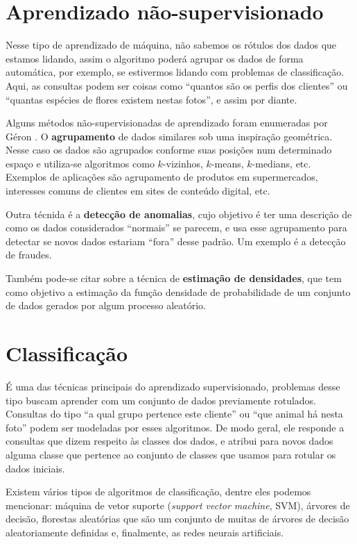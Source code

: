 \documentclass[12pt,brazil]{article}
\newcommand{\eng}[1]{\emph{#1}}
\begin{document}
\section*{Aprendizado não-supervisionado}

Nesse tipo de aprendizado de máquina, não sabemos os rótulos dos dados que estamos lidando, assim o algoritmo poderá agrupar os dados de forma automática, por exemplo, se estivermos lidando com problemas de classificação. Aqui, as consultas podem ser coisas como ``quantos são os perfis dos clientes'' ou ``quantas espécies de flores existem nestas fotos'', e assim por diante.

Alguns métodos não-supervisionadas de aprendizado foram enumeradas por Géron \citep{hands}. O \textbf{agrupamento} de dados similares sob uma inspiração geométrica. Nesse caso os dados são agrupados conforme suas posições num determinado espaço e utiliza-se algoritmos como $k$-vizinhos, $k$-means, $k$-medians, etc. Exemplos de aplicações são agrupamento de produtos em supermercados, interesses comuns de clientes em sites de conteúdo digital, etc.

Outra técnida é a \textbf{detecção de anomalias}, cujo objetivo é ter uma descrição de como os dados considerados ``normais'' se parecem, e usa esse agrupamento para detectar se novos dados estariam ``fora'' desse padrão. Um exemplo é a detecção de fraudes.

Também pode-se citar sobre a técnica de \textbf{estimação de densidades}, que tem como objetivo a estimação da função densidade de probabilidade de um conjunto de dados gerados por algum processo aleatório.

\section{Classificação}

É uma das técnicas principais do aprendizado supervisionado, problemas desse tipo buscam aprender com um conjunto de dados previamente rotulados. Consultas do tipo ``a qual grupo pertence este cliente'' ou ``que animal há nesta foto'' podem ser modeladas por esses algoritmos. De modo geral, ele responde a consultas que dizem respeito às classes dos dados, e atribui para novos dados alguma classe que pertence ao conjunto de classes que usamos para rotular os dados iniciais.

Existem vários tipos de algoritmos de classificação, dentre eles podemos mencionar: máquina de vetor suporte (\eng{support vector machine}, SVM), árvores de decisão, florestas aleatórias que são um conjunto de muitas de árvores de decisão aleatoriamente definidas e, finalmente, as redes neurais artificiais.
\end{document}
